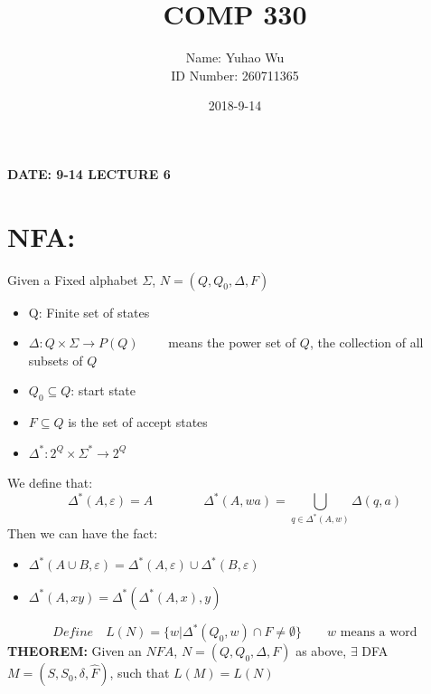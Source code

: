 \documentclass [9 pt]{article}
\theoremstyle{definition}
\begin{document}
\title{COMP 330}
\date{2018-9-14}
\author{Name: Yuhao Wu\\
ID Number: 260711365
}
\maketitle

\textbf{DATE: 9-14 LECTURE 6 }
\section*{NFA:}
Given a Fixed alphabet $\Sigma$, $N = (Q, Q_0, \Delta, F)$
\begin{itemize}
	\item Q: Finite set of states 
	\item $ \Delta: Q\times \Sigma \to P(Q)\quad\quad$ means the power set of $Q$, the collection of all subsets of $Q$
	\item $Q_0 \subseteq Q$: start state
	\item $F \subseteq Q $ is the set of accept states
	\item $\Delta^{*}: 2^Q \times \Sigma^{*} \to 2^Q$
\end{itemize}
We define that: $$ \Delta^{*}(A , \varepsilon )  = A \quad \quad\quad\quad \Delta^{*}(A, wa) = \bigcup_{q \in \Delta^{*}(A, w) } \Delta(q, a) $$ 
Then we can have the fact:
\begin{itemize}
	\item $ \Delta^{*}(A \cup B, \varepsilon ) = \Delta^{*}(A, \varepsilon ) \cup \Delta^{*}( B, \varepsilon ) $
	\item $\Delta^{*}(A, xy) = \Delta^{*}(\Delta^{*}(A, x), y) $
\end{itemize}
$$Define\quad L(N) = \{ w | \Delta^{*}(Q_0, w) \cap F \neq \emptyset \}\quad \quad w \text{ means a word}$$
\newline
\textbf{THEOREM:} Given an $NFA$, $N = (Q, Q_0, \Delta, F) $ as above, $\exists $ DFA $M= (S, S_0, \delta, \widehat{F})$, such that $L(M) = L(N)$
\end{document}
